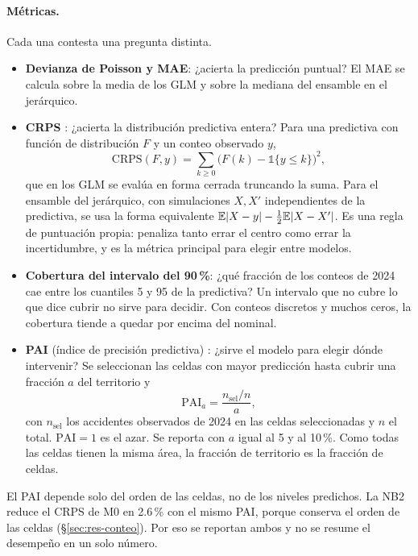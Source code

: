 \paragraph{Métricas.} Cada una contesta una pregunta distinta.
\begin{itemize}
	\item \textbf{Devianza de Poisson y MAE}: ¿acierta la predicción puntual? El
	      MAE se calcula sobre la media de los GLM y sobre la mediana del ensamble
	      en el jerárquico.
	\item \textbf{CRPS} \parencite{gneiting2007strictly}: ¿acierta la distribución
	      predictiva entera? Para una predictiva con función de distribución $F$ y
	      un conteo observado $y$,
	      \begin{equation}
		      \mathrm{CRPS}(F, y) = \sum_{k \ge 0} \big(F(k) - \mathbb{1}\{y \le k\}\big)^2 ,
	      \end{equation}
	      que en los GLM se evalúa en forma cerrada truncando la suma. Para el
	      ensamble del jerárquico, con simulaciones $X, X'$ independientes de la
	      predictiva, se usa la forma equivalente
	      $\mathbb{E}|X - y| - \tfrac{1}{2}\mathbb{E}|X - X'|$. Es una regla de puntuación propia:
	      penaliza tanto errar el centro como errar la incertidumbre, y es la
	      métrica principal para elegir entre modelos.
	\item \textbf{Cobertura del intervalo del 90\,\%}: ¿qué fracción de los
	      conteos de 2024 cae entre los cuantiles 5 y 95 de la predictiva? Un
	      intervalo que no cubre lo que dice cubrir no sirve para decidir. Con
	      conteos discretos y muchos ceros, la cobertura tiende a quedar por
	      encima del nominal.
	\item \textbf{PAI} (índice de precisión predictiva)
	      \parencite{chainey2008utility}: ¿sirve el modelo para elegir dónde intervenir?
	      Se seleccionan las celdas con mayor predicción hasta cubrir una fracción
	      $a$ del territorio y
	      \begin{equation}
		      \mathrm{PAI}_a = \frac{n_{\text{sel}} / n}{a},
	      \end{equation}
	      con $n_{\text{sel}}$ los accidentes observados de 2024 en las celdas
	      seleccionadas y $n$ el total. $\mathrm{PAI} = 1$ es el azar. Se reporta
	      con $a$ igual al 5 y al 10\,\%. Como todas las celdas tienen la misma área,
	      la fracción de territorio es la fracción de celdas.
\end{itemize}

El PAI depende solo del orden de las celdas, no de los niveles predichos.
La NB2 reduce el CRPS de M0 en 2.6\,\% con el mismo PAI, porque conserva el orden de las celdas (§\ref{sec:res-conteo}). Por eso se reportan ambos y no se resume el desempeño en un solo
número.
